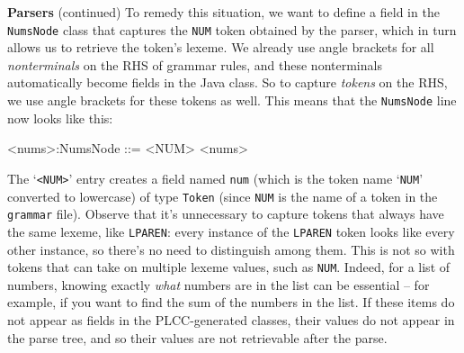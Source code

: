 \begin{minipage}[t]{\sw}
\slidenumber
\LARGE
{\bf Parsers} (continued)\exx
To remedy this situation,
we want to define a field
in the \verb'NumsNode' class that captures
the \verb'NUM' token obtained by the parser,
which in turn allows us to retrieve the token's lexeme.
We already use angle brackets
for all {\em nonterminals} on the RHS of grammar rules,
and these nonterminals automatically become fields in the Java class.
So to capture {\em tokens} on the RHS,
we use angle brackets for these tokens as well.
This means that the \verb'NumsNode' line now looks like this:
\begin{qv}
<nums>:NumsNode  ::= <NUM> <nums>
\end{qv}
The `\verb'<NUM>'' entry creates a field named \verb'num'
(which is the token name `\verb'NUM'' converted to lowercase)
of type \verb'Token' (since \verb'NUM' is the name of a token 
in the \verb'grammar' file).\exx
Observe that it's unnecessary
to capture tokens that always have the same lexeme,
like \verb'LPAREN':
every instance of the \verb'LPAREN' token
looks like every other instance,
so there's no need to distinguish among them.
This is not so with tokens that can take
on multiple lexeme values, such as \verb'NUM'.
Indeed, for a list of numbers,
knowing exactly {\em what} numbers are in the list
can be essential --
for example, if you want to find the sum of the numbers in the list.
If these items do not appear as fields in the PLCC-generated classes,
their values do not appear in the parse tree,
and so their values are not retrievable after the parse.
\end{minipage}
\clearpage
